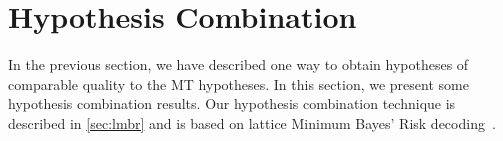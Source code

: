 


\section{Hypothesis Combination}
\label{sec:gyroTransSysComb}

In the previous section, we have described one way
to obtain hypotheses of comparable quality to the
MT hypotheses. In this section, we present some
hypothesis combination results.
Our hypothesis combination technique
is described in \autoref{sec:lmbr} and is
based on lattice Minimum Bayes' Risk
decoding~\citep{blackwood:2010:PHD}.


